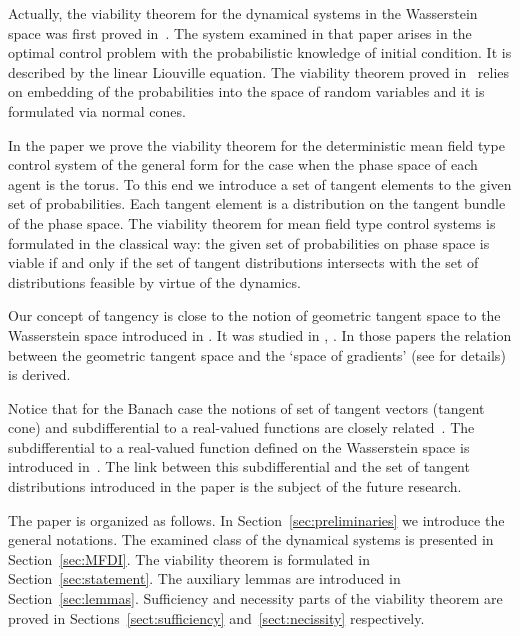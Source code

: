 \documentclass[12pt]{article}
\begin{document}
Actually,  the viability theorem for the dynamical systems in the Wasserstein space was first proved in~\cite{Viability_wasserstein_probabilistic}. The system examined in that paper arises in the optimal control problem with the  probabilistic knowledge of initial
condition. It is described by the linear Liouville equation. The viability theorem proved in~\cite{Viability_wasserstein_probabilistic} relies on embedding of the probabilities into the space of random variables and it is formulated via normal cones.

In the paper we prove the viability theorem for the deterministic mean field type control system of the general form for the case when the phase space of each agent is the torus. To this end we introduce a set of tangent elements to the given set of probabilities.  Each tangent element is a distribution on the  tangent bundle of the phase space. The viability theorem for mean field type control systems is formulated in the classical way: the given set of probabilities on phase space is viable if and only if the set of tangent distributions intersects with the set of distributions feasible by virtue of the dynamics. 

Our concept of tangency is close to the notion of geometric tangent space to the Wasserstein space introduced in \cite{Gigli}. It  was studied in \cite{Gigli}, \cite{Lott}. In those papers the relation between the geometric tangent space and the `space
of gradients' (see \cite[Definition 8.4.1]{Ambrosio} for details) is derived.

Notice that for the Banach case the notions of set of tangent vectors (tangent cone) and   subdifferential to a real-valued functions are closely related~\cite{Mordukhovich}. The subdifferential to a real-valued function defined on the Wasserstein space is introduced in~\cite[\S 10.3]{Ambrosio}. The link between this subdifferential and the set of tangent distributions introduced in the paper is the subject of the future research.

The paper is organized as follows. In  Section~\ref{sec:preliminaries} we introduce the general notations. The examined class of the dynamical systems is presented in Section~\ref{sec:MFDI}. The viability theorem is formulated in Section~\ref{sec:statement}. The auxiliary lemmas are introduced in Section~\ref{sec:lemmas}. Sufficiency and necessity parts of the viability theorem are proved in Sections~\ref{sect:sufficiency} and~\ref{sect:necissity} respectively.
\end{document}
